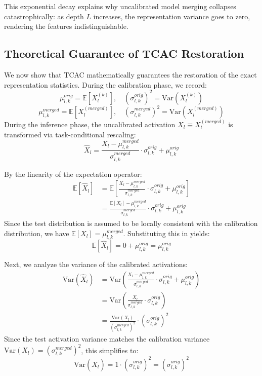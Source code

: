 \documentclass{article}
\theoremstyle{plain}
\theoremstyle{definition}
\theoremstyle{remark}
\begin{document}
This exponential decay explains why uncalibrated model merging collapses catastrophically: as depth $L$ increases, the representation variance goes to zero, rendering the features indistinguishable.

\subsection{Theoretical Guarantee of TCAC Restoration}
We now show that TCAC mathematically guarantees the restoration of the exact representation statistics.
During the calibration phase, we record:
\begin{equation}
\mu_{l, k}^{orig} = \mathbb{E}[X_l^{(k)}], \quad (\sigma_{l, k}^{orig})^2 = \text{Var}(X_l^{(k)})
\end{equation}
\begin{equation}
\mu_{l, k}^{merged} = \mathbb{E}[X_l^{(merged)}], \quad (\sigma_{l, k}^{merged})^2 = \text{Var}(X_l^{(merged)})
\end{equation}
During the inference phase, the uncalibrated activation $X_l \equiv X_l^{(merged)}$ is transformed via task-conditional rescaling:
\begin{equation}
\hat{X}_l = \frac{X_l - \mu_{l, k}^{merged}}{\sigma_{l, k}^{merged}} \cdot \sigma_{l, k}^{orig} + \mu_{l, k}^{orig}
\end{equation}

By the linearity of the expectation operator:
\begin{align}
\mathbb{E}[\hat{X}_l] &= \mathbb{E}\left[ \frac{X_l - \mu_{l, k}^{merged}}{\sigma_{l, k}^{merged}} \cdot \sigma_{l, k}^{orig} + \mu_{l, k}^{orig} \right] \\
&= \frac{\mathbb{E}[X_l] - \mu_{l, k}^{merged}}{\sigma_{l, k}^{merged}} \cdot \sigma_{l, k}^{orig} + \mu_{l, k}^{orig}
\end{align}
Since the test distribution is assumed to be locally consistent with the calibration distribution, we have $\mathbb{E}[X_l] = \mu_{l, k}^{merged}$. Substituting this in yields:
\begin{equation}
\mathbb{E}[\hat{X}_l] = 0 + \mu_{l, k}^{orig} = \mu_{l, k}^{orig}
\end{equation}

Next, we analyze the variance of the calibrated activations:
\begin{align}
\text{Var}(\hat{X}_l) &= \text{Var}\left( \frac{X_l - \mu_{l, k}^{merged}}{\sigma_{l, k}^{merged}} \cdot \sigma_{l, k}^{orig} + \mu_{l, k}^{orig} \right) \\
&= \text{Var}\left( \frac{X_l}{\sigma_{l, k}^{merged}} \cdot \sigma_{l, k}^{orig} \right) \\
&= \frac{\text{Var}(X_l)}{(\sigma_{l, k}^{merged})^2} \cdot (\sigma_{l, k}^{orig})^2
\end{align}
Since the test activation variance matches the calibration variance $\text{Var}(X_l) = (\sigma_{l, k}^{merged})^2$, this simplifies to:
\begin{equation}
\text{Var}(\hat{X}_l) = 1 \cdot (\sigma_{l, k}^{orig})^2 = (\sigma_{l, k}^{orig})^2
\end{equation}
\end{document}
